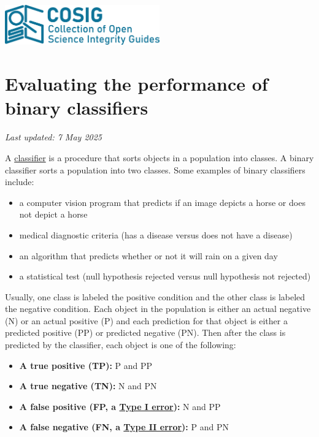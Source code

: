 \documentclass[letterpaper, 12pt]{article}
\begin{document}
\flushleft
\includegraphics[width=0.5\textwidth]{img/home/241017_final_logo_mockup.png}

\section*{Evaluating the performance of binary classifiers}
\textit{Last updated: 7 May 2025}

A \href{https://en.wikipedia.org/wiki/Classification_rule}{classifier} is a procedure that sorts objects in a population into classes. A binary classifier sorts a population into two classes. Some examples of binary classifiers include:

\begin{itemize}
    \setlength\itemsep{-0.5em}
    \item a computer vision program that predicts if an image depicts a horse or does not depict a horse
    \item medical diagnostic criteria (has a disease versus does not have a disease)
    \item an algorithm that predicts whether or not it will rain on a given day
    \item a statistical test (null hypothesis rejected versus null hypothesis not rejected)
\end{itemize}

Usually, one class is labeled the positive condition and the other class is labeled the negative condition. Each object in the population is either an actual negative (N) or an actual positive (P) and each prediction for that object is either a predicted positive (PP) or predicted negative (PN). Then after the class is predicted by the classifier, each object is one of the following:

\begin{itemize}
    \setlength\itemsep{-0.5em}
    \item \textbf{A true positive (TP):} P and PP
    \item \textbf{A true negative (TN):} N and PN
    \item \textbf{A false positive (FP, a \href{https://en.wikipedia.org/wiki/Type_I_and_type_II_errors}{Type I error}):} N and PP
    \item \textbf{A false negative (FN, a \href{https://en.wikipedia.org/wiki/Type_I_and_type_II_errors}{Type II error}):} P and PN
\end{itemize}
\end{document}
